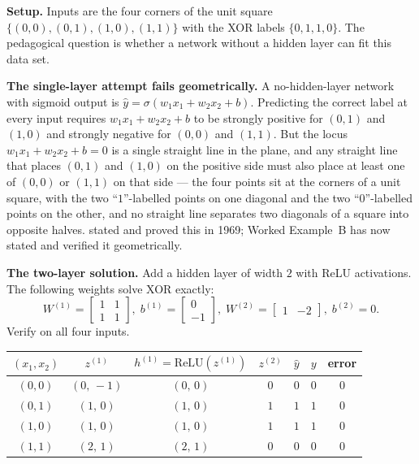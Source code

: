 \begin{workedexample}

\textbf{Setup.} Inputs are the four corners of the unit square
$\{(0,0), (0,1), (1,0), (1,1)\}$ with the XOR labels
$\{0, 1, 1, 0\}$. The pedagogical question is whether a network
without a hidden layer can fit this data set.

\textbf{The single-layer attempt fails geometrically.} A
no-hidden-layer network with sigmoid output is
$\hat y = \sigma(w_1 x_1 + w_2 x_2 + b)$. Predicting the correct
label at every input requires $w_1 x_1 + w_2 x_2 + b$ to be
strongly positive for $(0,1)$ and $(1,0)$ and strongly negative
for $(0,0)$ and $(1,1)$. But the locus
$w_1 x_1 + w_2 x_2 + b = 0$ is a single straight line in the
plane, and any straight line that places $(0,1)$ and $(1,0)$ on
the positive side must also place at least one of $(0,0)$ or
$(1,1)$ on that side --- the four points sit at the corners of a
unit square, with the two ``$1$''-labelled points on one diagonal
and the two ``$0$''-labelled points on the other, and no straight
line separates two diagonals of a square into opposite halves.
\citet{minsky1969perceptrons} stated and proved this in 1969;
Worked Example~B has now stated and verified it geometrically.

\textbf{The two-layer solution.} Add a hidden layer of width $2$
with ReLU activations. The following weights solve XOR exactly:
\[
  W^{(1)} = \begin{bmatrix} 1 & 1 \\ 1 & 1 \end{bmatrix}, \;
  b^{(1)} = \begin{bmatrix} 0 \\ -1 \end{bmatrix}, \;
  W^{(2)} = \begin{bmatrix} 1 & -2 \end{bmatrix}, \;
  b^{(2)} = 0.
\]
Verify on all four inputs.

\smallskip
\begin{center}
\small
\begin{tabular}{|c|c|c|c|c|c|c|}
\hline
$(x_1, x_2)$ & $z^{(1)}$ & $h^{(1)} = \mathrm{ReLU}(z^{(1)})$ & $z^{(2)}$ & $\hat y$ & $y$ & error \\
\hline
$(0, 0)$ & $(0,\, -1)$ & $(0,\, 0)$ & $0$ & $0$ & $0$ & $0$ \\
$(0, 1)$ & $(1,\, 0)$ & $(1,\, 0)$ & $1$ & $1$ & $1$ & $0$ \\
$(1, 0)$ & $(1,\, 0)$ & $(1,\, 0)$ & $1$ & $1$ & $1$ & $0$ \\
$(1, 1)$ & $(2,\, 1)$ & $(2,\, 1)$ & $0$ & $0$ & $0$ & $0$ \\
\hline
\end{tabular}
\end{center}
\smallskip


\end{workedexample}
